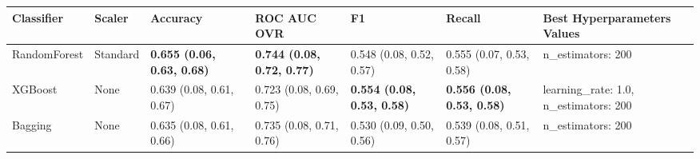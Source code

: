 \begin{tabular}{lllllll}
\toprule
Classifier & Scaler & Accuracy & ROC AUC OVR & F1 & Recall & Best Hyperparameters Values \\
\midrule
RandomForest & Standard & \textbf{0.655 (0.06, 0.63, 0.68)} & \textbf{0.744 (0.08, 0.72, 0.77)} & 0.548 (0.08, 0.52, 0.57) & 0.555 (0.07, 0.53, 0.58) & {{n\_estimators: 200}} \\
XGBoost & None & 0.639 (0.08, 0.61, 0.67) & 0.723 (0.08, 0.69, 0.75) & \textbf{0.554 (0.08, 0.53, 0.58)} & \textbf{0.556 (0.08, 0.53, 0.58)} & {{learning\_rate: 1.0, n\_estimators: 200}} \\
Bagging & None & 0.635 (0.08, 0.61, 0.66) & 0.735 (0.08, 0.71, 0.76) & 0.530 (0.09, 0.50, 0.56) & 0.539 (0.08, 0.51, 0.57) & {{n\_estimators: 200}} \\
\bottomrule
\end{tabular}
